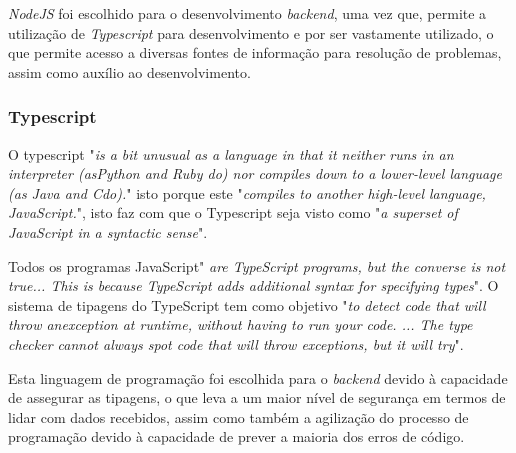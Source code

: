 \textit{NodeJS} foi escolhido para o desenvolvimento \textit{backend}, uma vez que, permite a utilização de \textit{Typescript} para desenvolvimento e por ser vastamente utilizado, o que permite acesso a diversas fontes de informação para resolução de problemas, assim como auxílio ao desenvolvimento.

\subsubsection{Typescript}
O typescript "\emph{is  a  bit  unusual  as  a  language  in  that  it  neither  runs  in  an  interpreter  (asPython  and  Ruby  do)  nor  compiles  down  to  a  lower-level  language  (as  Java  and  Cdo).}"\citep{typescript} isto porque este "\emph{compiles  to  another  high-level  language,  JavaScript.}"\citep{typescript}, isto faz com que o Typescript seja visto como "\emph{a  superset  of  JavaScript  in  a  syntactic  sense}"\citep{typescript}.

Todos os programas JavaScript" \emph{are  TypeScript  programs,  but  the  converse  is  not  true... This  is  because  TypeScript adds additional syntax for specifying types}". O sistema de tipagens do TypeScript tem como objetivo "\emph{to  detect  code  that  will  throw  anexception  at  runtime,  without  having  to  run  your  code. ... The  type  checker  cannot always spot code that will throw exceptions, but it will try}"\citep{typescript}.

Esta linguagem de programação foi escolhida para o \textit{backend} devido à capacidade de assegurar as tipagens, o que leva a um maior nível de segurança em termos de lidar com dados recebidos, assim como também a agilização do processo de programação devido à capacidade de prever a maioria dos erros de código.

\newpage











